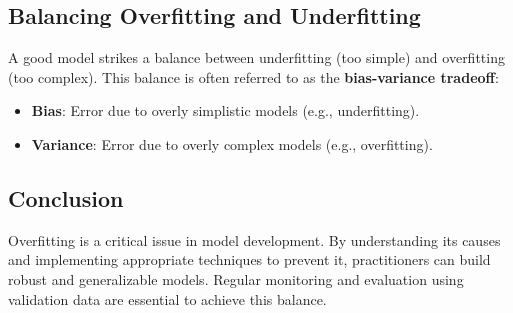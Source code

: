 \subsection*{Balancing Overfitting and Underfitting}
A good model strikes a balance between underfitting (too simple) and overfitting (too complex). This balance is often referred to as the \textbf{bias-variance tradeoff}:
\begin{itemize}
    \item \textbf{Bias}: Error due to overly simplistic models (e.g., underfitting).
    \item \textbf{Variance}: Error due to overly complex models (e.g., overfitting).
\end{itemize}

\subsection*{Conclusion}
Overfitting is a critical issue in model development. By understanding its causes and implementing appropriate techniques to prevent it, practitioners can build robust and generalizable models. Regular monitoring and evaluation using validation data are essential to achieve this balance.
